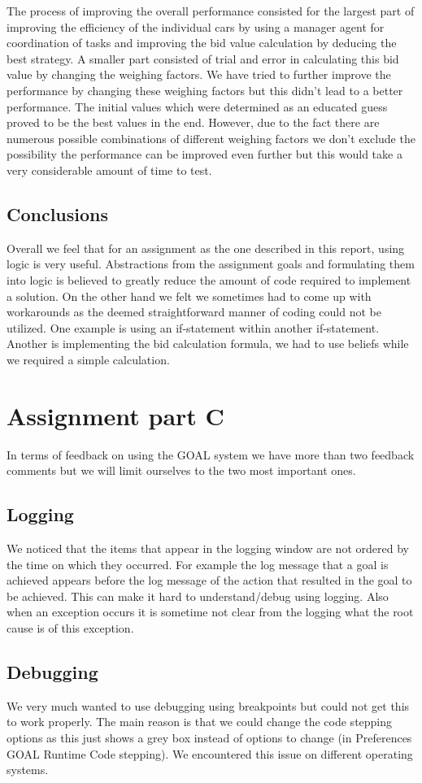 \documentclass[a4paper,11pt]{article}
\begin{document}
The process of improving the overall performance consisted for the largest part of improving the efficiency of the individual cars by using a manager agent for coordination of tasks and improving the bid value calculation by deducing the best strategy. A smaller part consisted of trial and error in calculating this bid value by changing the weighing factors. We have tried to further improve the performance by changing these weighing factors but this didn't lead to a better performance. The initial values which were determined as an educated guess proved to be the best values in the end. However, due to the fact there are numerous possible combinations of different weighing factors we don't exclude the possibility the performance can be improved even further but this would take a very considerable amount of time to test. 

\subsection{Conclusions}
Overall we feel that for an assignment as the one described in this report, using logic is very useful. Abstractions from the assignment goals and formulating them into logic is believed to greatly reduce the amount of code required to implement a solution. On the other hand we felt we sometimes had to come up with workarounds as the deemed straightforward manner of coding could not be utilized. One example is using an if-statement within another if-statement. Another is implementing the bid calculation formula, we had to use beliefs while we required a simple calculation. 

\section{Assignment part C}
In terms of feedback on using the GOAL system we have more than two feedback comments but we will limit ourselves to the two most important ones. 

\subsection{Logging}
We noticed that the items that appear in the logging window are not ordered by the time on which they occurred. For example the log message that a goal is achieved appears before the log message of the action that resulted in the goal to be achieved. This can make it hard to understand/debug using logging. Also when an exception occurs it is sometime not clear from the logging what the root cause is of this exception.

\subsection{Debugging}
We very much wanted to use debugging using breakpoints but could not get this to work properly. The main reason is that we could change the code stepping options as this just shows a grey box instead of options to change (in Preferences \textrightarrow GOAL \textrightarrow Runtime \textrightarrow Code stepping). We encountered this issue on different operating systems. 
\end{document}
